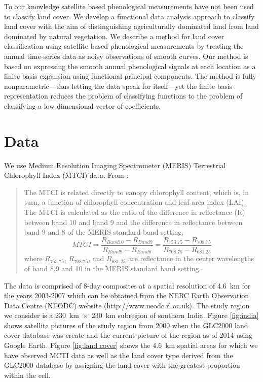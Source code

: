 To our knowledge satellite based phenological measurements have not been used to classify land cover. We develop a functional data analysis approach to classify land cover with the aim of distinguishing agriculturally dominated land from land dominated by natural vegetation. We describe a method for land cover classification using satellite based phenological measurements by treating the annual time-series data as noisy observations of smooth curves. Our method is based on expressing the smooth annual phenological signals at each location as a finite basis expansion using functional principal components. The method is fully nonparametric---thus letting the data speak for itself---yet the finite basis representation reduces the problem of classifying functions to the problem of classifying a low dimensional vector of coefficients. 

\section{Data} 

\label{sec:data} We use Medium Resolution Imaging Spectrometer (MERIS) Terrestrial Chlorophyll Index (MTCI) data. From \cite{Dash:2010kva}:
\begin{quote}
The MTCI is related directly to canopy chlorophyll content, which is, in turn, a function of chlorophyll concentration and leaf area index (LAI). The MTCI is calculated as the ratio of the difference in reflectance (R) between band 10 and band 9 and the difference in reflectance between band 9 and 8 of the MERIS standard band setting,
\begin{equation}
	MTCI = \frac{R_{Band 10} - R_{Band 9}}{R_{Band 9} - R_{Band 8}} = \frac{R_{ 753.75} - R_{708.75}}{R_{ 708.75} - R_{ 681.25}} \nonumber
\end{equation}
where $R_{753.75}$, $R_{708.75}$, and $R_{681.25}$ are reflectance in the center wavelengths of band 8,9 and 10 in the MERIS standard band setting.
\end{quote}

 The data is comprised of 8-day composites at a spatial resolution of 4.6~km for the years 2003-2007 which can be obtained from the NERC Earth Observation Data Centre (NEODC) website (http://www.neodc.rl.ac.uk). The study region we consider is a 230~km~$\times$~230~km subregion of southern India. Figure \ref{fig:india} shows satellite pictures of the study region from 2000 when the GLC2000 land cover database was create and the current picture of the region as of 2014 using Google Earth. Figure \ref{fig:land cover} shows the 4.6~km spatial areas for which we have observed MCTI data as well as the land cover type derived from the GLC2000 database by assigning the land cover with the greatest proportion within the cell.  
 
